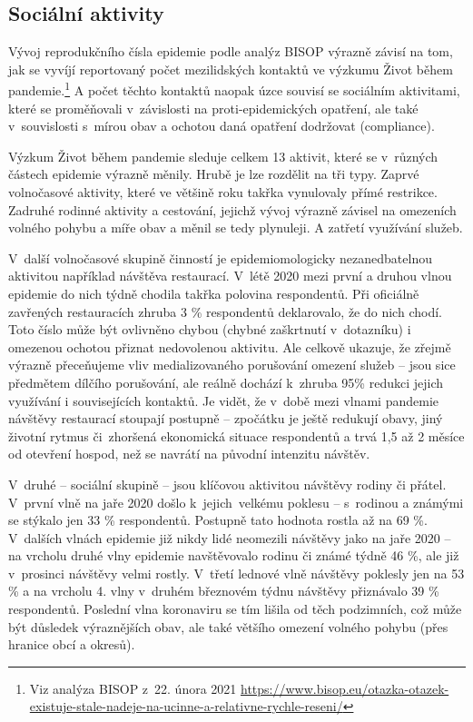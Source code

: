 \subsection*{Sociální aktivity}
\label{Socialni_aktivity}

Vývoj reprodukčního čísla epidemie podle analýz BISOP výrazně závisí na tom, jak se vyvíjí reportovaný počet mezilidských kontaktů ve výzkumu Život během pandemie.\footnote{Viz analýza BISOP z 22. února 2021
\url{https://www.bisop.eu/otazka-otazek-existuje-stale-nadeje-na-ucinne-a-relativne-rychle-reseni/}} A počet těchto kontaktů naopak úzce souvisí se sociálním aktivitami, které se proměňovali v závislosti na proti-epidemických opatření, ale také v souvislosti s mírou obav a ochotou daná opatření dodržovat (compliance).

Výzkum Život během pandemie sleduje celkem 13 aktivit, které se v různých částech epidemie výrazně měnily. Hrubě je lze rozdělit na tři typy. Zaprvé volnočasové aktivity, které ve většině roku takřka vynulovaly přímé restrikce. Zadruhé rodinné aktivity a cestování, jejichž vývoj výrazně závisel na omezeních volného pohybu a míře obav a měnil se tedy plynuleji. A zatřetí využívání služeb.

V další volnočasové skupině činností je epidemiomologicky nezanedbatelnou aktivitou například návštěva restaurací. V létě 2020 mezi první a druhou vlnou epidemie do nich týdně chodila takřka polovina respondentů. Při oficiálně zavřených restauracích zhruba 3 \% respondentů deklarovalo, že do nich chodí. Toto číslo může být ovlivněno chybou (chybné zaškrtnutí v dotazníku) i omezenou ochotou přiznat nedovolenou aktivitu. Ale celkově ukazuje, že zřejmě výrazně přeceňujeme vliv medializovaného porušování omezení služeb – jsou sice předmětem dílčího porušování, ale reálně dochází k zhruba 95\% redukci jejich využívání i souvisejících kontaktů. Je vidět, že v době mezi vlnami pandemie návštěvy restaurací stoupají postupně – zpočátku je ještě redukují obavy, jiný životní rytmus či zhoršená ekonomická situace respondentů a trvá 1,5 až 2 měsíce od otevření hospod, než se navrátí na původní intenzitu návštěv.

V druhé – sociální skupině – jsou klíčovou aktivitou návštěvy rodiny či přátel. V první vlně na jaře 2020 došlo k jejich velkému poklesu – s rodinou a známými se stýkalo jen 33 \% respondentů. Postupně tato hodnota rostla až na 69 \%. V dalších vlnách epidemie
již nikdy lidé neomezili návštěvy jako na jaře 2020 – na vrcholu druhé vlny epidemie navštěvovalo rodinu či známé týdně 46 \%, ale již v prosinci návštěvy velmi rostly. V třetí lednové vlně návštěvy poklesly jen na 53 \% a na vrcholu 4. vlny v druhém březnovém týdnu návštěvy přiznávalo 39 \% respondentů. Poslední vlna koronaviru se tím lišila od těch podzimních, což může být důsledek výraznějších obav, ale také většího omezení volného pohybu (přes hranice obcí a okresů).

